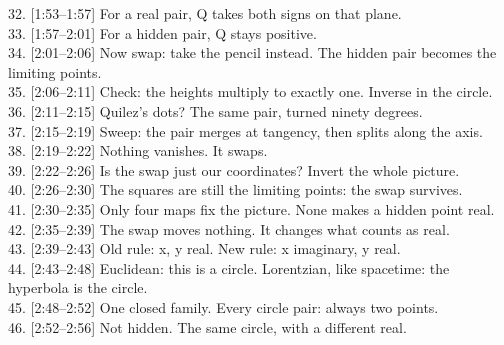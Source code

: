 \documentclass[10pt]{article}
\begin{document}
32. [1:53--1:57] For a real pair, Q takes both signs on that plane.\\
33. [1:57--2:01] For a hidden pair, Q stays positive.\\
34. [2:01--2:06] Now swap: take the pencil instead. The hidden pair becomes the limiting points.\\
35. [2:06--2:11] Check: the heights multiply to exactly one. Inverse in the circle.\\
36. [2:11--2:15] Quilez's dots? The same pair, turned ninety degrees.\\
37. [2:15--2:19] Sweep: the pair merges at tangency, then splits along the axis.\\
38. [2:19--2:22] Nothing vanishes. It swaps.\\
39. [2:22--2:26] Is the swap just our coordinates? Invert the whole picture.\\
40. [2:26--2:30] The squares are still the limiting points: the swap survives.\\
41. [2:30--2:35] Only four maps fix the picture. None makes a hidden point real.\\
42. [2:35--2:39] The swap moves nothing. It changes what counts as real.\\
43. [2:39--2:43] Old rule: x, y real. New rule: x imaginary, y real.\\
44. [2:43--2:48] Euclidean: this is a circle. Lorentzian, like spacetime: the hyperbola is the circle.\\
45. [2:48--2:52] One closed family. Every circle pair: always two points.\\
46. [2:52--2:56] Not hidden. The same circle, with a different real.
\end{document}
